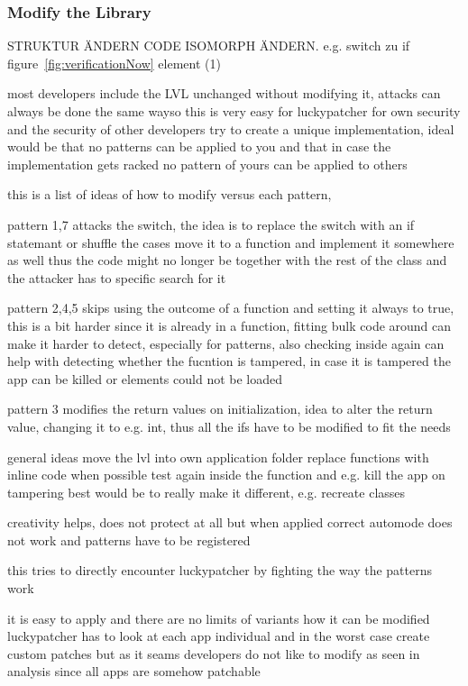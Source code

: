 \subsubsection{Modify the Library} \label{subsection:counter-modifications-library}
STRUKTUR ÄNDERN
CODE ISOMORPH ÄNDERN. e.g. switch zu if
figure~\ref{fig:verificationNow} element (1)

most developers include the LVL unchanged without modifying it, attacks can always be done the same wayso this is very easy for luckypatcher
for own security and the security of other developers try to create a unique implementation,
ideal would be that no patterns can be applied to you and that in case the implementation gets racked no pattern of yours can be applied to others

this is a list of ideas of how to modify versus each pattern,

pattern 1,7 attacks the switch, the idea is to replace the switch with an if statemant or shuffle the cases
move it to a function and implement it somewhere as well thus the code might no longer be together with the rest of the class and the attacker has to specific search for it

pattern 2,4,5 skips using the outcome of a function and setting it always to true, this is a bit harder since it is already in a function, fitting bulk code around can make it harder to detect, especially for patterns, also checking inside again can help with detecting whether the fucntion is tampered, in case it is tampered the app can be killed or elements could not be loaded

pattern 3 modifies the return values on initialization, idea to alter the return value, changing it to e.g. int, thus all the ifs have to be modified to fit the needs


general ideas
move the lvl into own application folder
replace functions with inline code when possible
test again inside the function and e.g. kill the app on tampering
best would be to really make it different, e.g. recreate classes


creativity helps, does not protect at all but when applied correct automode does not work and patterns have to be registered

this tries to directly encounter luckypatcher by fighting the way the patterns work

it is easy to apply and there are no limits of variants how it can be modified
luckypatcher has to look at each app individual and in the worst case create custom patches
but as it seams developers do not like to modify as seen in analysis since all apps are somehow patchable
